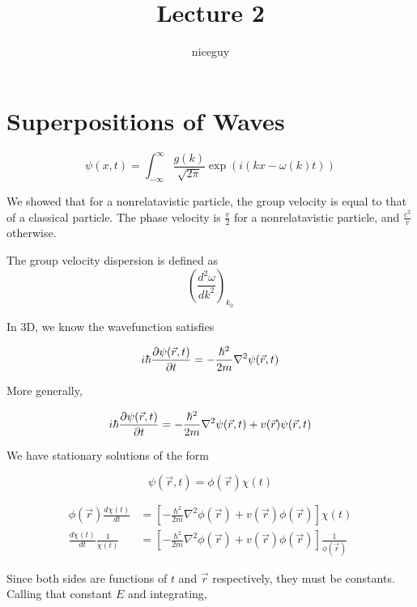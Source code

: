 \documentclass[12pt]{article}
\title{Lecture 2}
\author{niceguy}
\begin{document}
\maketitle

\section{Superpositions of Waves}

\begin{equation}
    \psi(x,t) = \int_{-\infty}^\infty \frac{g(k)}{\sqrt{2\pi}}\exp(i(kx - \omega(k)t))
\end{equation}

We showed that for a nonrelatavistic particle, the group velocity is equal to that of a classical particle. The phase velocity is $\frac{v}{2}$ for a nonrelatavistic particle, and $\frac{c^2}{v}$ otherwise.

\begin{defn}
    The group velocity dispersion is defined as
    $$\left(\frac{d^2\omega}{dk^2}\right)_{k_0}$$
\end{defn}

In 3D, we know the wavefunction satisfies

\begin{equation}
    i\hbar \frac{\partial \psi(\vec r,t)}{\partial t} = -\frac{\hbar^2}{2m} \nabla^2 \psi(\vec r,t)
\end{equation}

More generally,

\begin{equation}
    i\hbar \frac{\partial \psi(\vec r,t)}{\partial t} = -\frac{\hbar^2}{2m} \nabla^2 \psi(\vec r,t) + v(\vec r)\psi(\vec r,t)
\end{equation}

We have stationary solutions of the form

$$\psi(\vec r,t) = \phi(\vec r)\chi(t)$$

\begin{align*}
    \phi(\vec r)\frac{d\chi(t)}{dt} &= \left[-\frac{\hbar^2}{2m}\nabla^2\phi(\vec r) + v(\vec r)\phi(\vec r)\right] \chi(t) \\
    \frac{d\chi(t)}{dt}\frac{1}{\chi(t)} &= \left[-\frac{\hbar^2}{2m}\nabla^2\phi(\vec r) + v(\vec r)\phi(\vec r)\right] \frac{1}{\phi(\vec r)}
\end{align*}

Since both sides are functions of $t$ and $\vec r$ respectively, they must be constants. Calling that constant $E$ and integrating,
\end{document}

